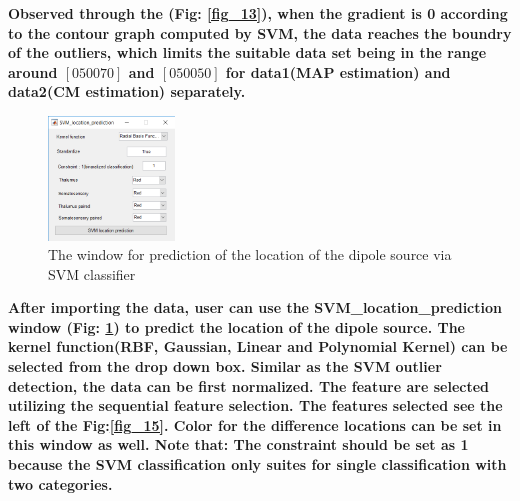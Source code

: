 \documentclass[5p]{elsarticle}
\begin{document}
\begin{frontmatter}
\bf Observed through the (Fig: \ref{fig_13}), when the gradient is 0 according to the contour graph computed by SVM, the data reaches the boundry of the outliers, which limits the suitable data set being in the range around $[0 50 0 70]$ and  $[0 50 0 50]$ for data1(MAP estimation) and data2(CM estimation) separately. 


\begin{figure}[h!]
    \begin{center}
    \includegraphics[width=0.3\textwidth]{SVM_location_detection.PNG}
  \end{center}
  \caption{The window for prediction of the location of the dipole source via SVM classifier}
  \label{fig_14}
\end{figure}

\bf After importing the data, user can use the SVM_location_prediction window (Fig: \ref{fig_14}) to predict the location of the dipole source. The kernel function(RBF, Gaussian, Linear and Polynomial Kernel) can be selected from the drop down box. Similar as the SVM outlier detection, the data can be first normalized. The feature are selected utilizing the sequential feature selection. The features selected see the left of the Fig:\ref{fig_15}. Color for the difference locations can be set in this window as well. 
\bf Note that: The constraint should be set as 1 because the SVM classification only suites for single classification with two categories.


\end{frontmatter}
\end{document}
